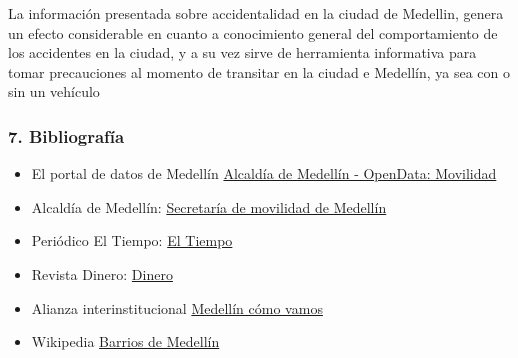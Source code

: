 \documentclass[]{article}
\begin{document}
La información presentada sobre accidentalidad en la ciudad de Medellin,
genera un efecto considerable en cuanto a conocimiento general del
comportamiento de los accidentes en la ciudad, y a su vez sirve de
herramienta informativa para tomar precauciones al momento de transitar
en la ciudad e Medellín, ya sea con o sin un vehículo

\hypertarget{bibliografia}{%
\subsubsection{7. Bibliografía}\label{bibliografia}}

\begin{itemize}
\item
  El portal de datos de Medellín
  \href{https://geomedellin-m-medellin.opendata.arcgis.com/search?tags=movilidad}{Alcaldía
  de Medellín - OpenData: Movilidad}
\item
  Alcaldía de Medellín:
  \href{https://www.medellin.gov.co/movilidad/cifras-estudios/viewcategory/1872-parque-automotor}{Secretaría
  de movilidad de Medellín}
\item
  Periódico El Tiempo:
  \href{https://www.eltiempo.com/colombia/medellin/el-valle-de-aburra-supero-las-900-000-motos-matriculadas-343266}{El
  Tiempo}
\item
  Revista Dinero:
  \href{https://www.dinero.com/economia/articulo/cuantos-carros-y-motos-se-vendieron-en-enero-de-2019/266687}{Dinero}
\item
  Alianza interinstitucional
  \href{https://www.medellincomovamos.org/la-ciudad/}{Medellín cómo
  vamos}
\item
  Wikipedia
  \href{https://es.wikipedia.org/wiki/Anexo:Barrios_de_Medell\%C3\%ADn}{Barrios
  de Medellín}
\end{itemize}
\end{document}
